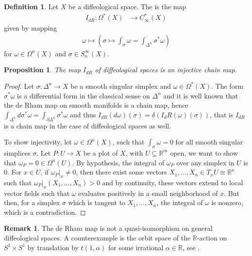 \documentclass{scrartcl}
\let\emph\relax
\theoremstyle{plain}
\newtheorem{proposition}[theorem]{Proposition}
\theoremstyle{definition}
\newtheorem{definition}[theorem]{Definition}
\newtheorem{remark}[theorem]{Remark}
\newcommand{\R}{\mathbb R}
\renewcommand{\subset}{\subseteq}
\newcommand{\iso}{\cong}
\begin{document}
\begin{definition}
    Let $X$ be a diffeological space. The \emph{de Rham comparison map} is the map 
    \begin{align*}
        I_{dR}\colon \Omega^*(X) &\to C^*_\infty(X)
    \end{align*}
    given by mapping 
    \begin{align*}
        \omega \mapsto \left(\sigma\mapsto \int_{\sigma}\omega = \int_{\Delta^n}\sigma^*\omega\right)
    \end{align*}
    for $\omega\in\Omega^n(X)$ and $\sigma\in S_n^\infty(X)$.
\end{definition}

\begin{proposition}\label{thm:deRham-properties}
    The map $I_{dR}$ of diffeological spaces is an injective chain map.
\end{proposition}
\begin{proof}
    Let $\sigma\colon\Delta^n\to X$ be a smooth singular simplex and $\omega\in\Omega^*(X)$. The form $\sigma^*\omega$ is a differential form in the classical sense on $\Delta^n$ and it is well known that the de Rham map on smooth manifolds is a chain map, hence $\int_{\Delta^n}d\sigma^*\omega = \int_{\partial\Delta^n}\sigma^*\omega$ and thus $I_{dR}(d\omega)(\sigma) = \delta(I_dR(\omega)(\sigma))$, that is $I_{dR}$ is a chain map in the case of diffeological spaces as well. 
    
    To show injectivity, let $\omega\in \Omega^n(X)$, such that $\int_\sigma \omega = 0$ for all smooth singular simplices $\sigma$. Let $P\colon U\to X$ be a plot of $X$, with $U\subset \R^m$ open, we want to show that $\omega_P = 0\in\Omega^n(U)$. By hypothesis, the integral of $\omega_P$ over any simplex in $U$ is $0$. For $x\in U$, if $\omega_P|_x\neq 0$, then there exist some vectors $X_1,\dots, X_n\in T_xU \iso \R^n$ such that $\omega_P|_x(X_1, \dots, X_n) > 0$ and by continuity, these vectors extend to local vector fields such that $\omega$ evaluates positively in a small neighborhood of $x$. But then, for a simplex $\sigma$ which is tangent to $X_1, \dots, X_n$, the integral of $\omega$ is nonzero, which is a contradiction. 
\end{proof}

\begin{remark}
The de Rham map is not a quasi-isomorphism on general diffeological spaces. A counterexample is the orbit space of the $\R$-action on $S^1\times S^1$ by translation by $t(1, \alpha)$ for some irrational $\alpha\in \R$, see \cite{iglesias2013diffeology}.
\end{remark}
\end{document}
